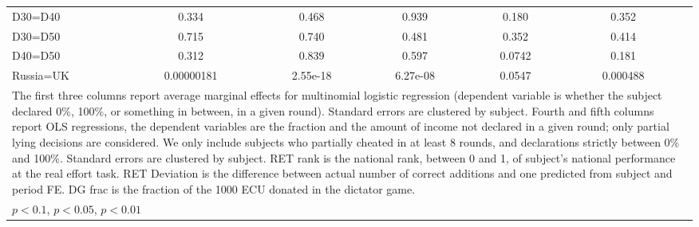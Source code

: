 \begin{tabular}{l|cccccc|cc|cc}
D30=D40         &    0.334         &         &    0.468         &         &    0.939         &         &    0.180         &         &    0.352         &         \\
D30=D50         &    0.715         &         &    0.740         &         &    0.481         &         &    0.352         &         &    0.414         &         \\
D40=D50         &    0.312         &         &    0.839         &         &    0.597         &         &   0.0742         &         &    0.181         &         \\
Russia=UK       &0.00000181         &         & 2.55e-18         &         & 6.27e-08         &         &   0.0547         &         & 0.000488         &         \\
\hline\hline
\multicolumn{11}{p{18cm}}{\tiny The first three columns report average marginal effects for multinomial logistic regression (dependent variable is whether the subject declared 0\%, 100\%, or something in between, in a given round). Standard errors are clustered by subject. Fourth and fifth columns report OLS regressions, the dependent variables are the fraction and the amount of income not declared in a given round; only partial lying decisions are considered. We only include subjects who partially cheated in at least 8 rounds, and declarations strictly between 0\% and 100\%. Standard errors are clustered by subject. RET rank is the national rank, between 0 and 1, of subject's national performance at the real effort task. RET Deviation is the difference between actual number of correct additions and one predicted from subject and period FE. DG frac is the fraction of the 1000 ECU donated in the dictator game.}\\
\multicolumn{11}{l}{\tiny \sym{*} \(p<0.1\), \sym{**} \(p<0.05\), \sym{***} \(p<0.01\)}\\
\end{tabular}